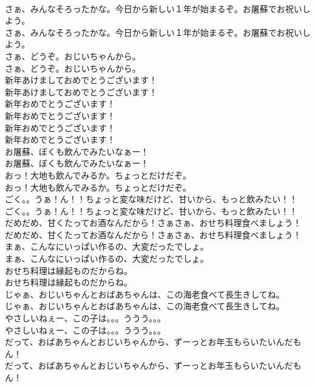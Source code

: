 \documentclass[8pt]{extreport}
\begin{document}
\begin{CJK}{UTF8}{min}
\\	さぁ、みんなそろったかな。今日から新しい１年が始まるぞ。お屠蘇でお祝いしよう。	
\\	さぁ、みんなそろったかな。今日から新しい１年が始まるぞ。お屠蘇でお祝いしよう。 
\\	さぁ、どうぞ。おじいちゃんから。	
\\	さぁ、どうぞ。おじいちゃんから。 
\\	新年あけましておめでとうございます！	
\\	新年あけましておめでとうございます！ 
\\	新年おめでとうございます！	
\\	新年おめでとうございます！ 
\\	新年おめでとうございます！	
\\	新年おめでとうございます！ 
\\	お屠蘇、ぼくも飲んでみたいなぁー！	
\\	お屠蘇、ぼくも飲んでみたいなぁー！ 
\\	おっ！大地も飲んでみるか。ちょっとだけだぞ。	
\\	おっ！大地も飲んでみるか。ちょっとだけだぞ。 
\\	ごく。。うぁ！ん！！ちょっと変な味だけど、甘いから、もっと飲みたい！！	
\\	ごく。。うぁ！ん！！ちょっと変な味だけど、甘いから、もっと飲みたい！！ 
\\	だめだめ、甘くたってお酒なんだから！さぁさぁ、おせち料理食べましょう！	
\\	だめだめ、甘くたってお酒なんだから！さぁさぁ、おせち料理食べましょう！ 
\\	まぁ、こんなにいっぱい作るの、大変だったでしょ。	
\\	まぁ、こんなにいっぱい作るの、大変だったでしょ。 
\\	おせち料理は縁起ものだからね。	
\\	おせち料理は縁起ものだからね。 
\\	じゃぁ、おじいちゃんとおばあちゃんは、この海老食べて長生きしてね。	
\\	じゃぁ、おじいちゃんとおばあちゃんは、この海老食べて長生きしてね。 
\\	やさしいねぇー、この子は。。。ううう。。。	
\\	やさしいねぇー、この子は。。。ううう。。。 
\\	だって、おばあちゃんとおじいちゃんから、ずーっとお年玉もらいたいんだもん！	
\\	だって、おばあちゃんとおじいちゃんから、ずーっとお年玉もらいたいんだもん！ 

\end{CJK}
\end{document}

